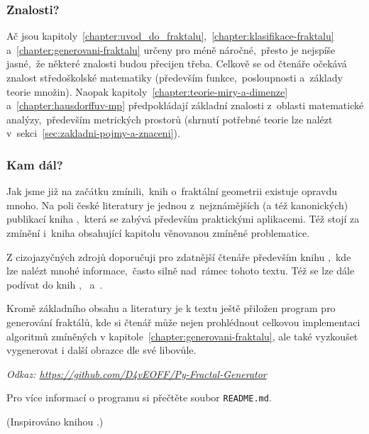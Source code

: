 \subsubsection{Znalosti?}

Ač jsou kapitoly~\ref{chapter:uvod_do_fraktalu},~\ref{chapter:klasifikace-fraktalu} a~\ref{chapter:generovani-fraktalu} určeny pro méně náročné,~přesto je nejspíše jasné,~že některé znalosti budou přecijen třeba. Celkově se od čtenáře očekává znalost středoškolské matematiky (především funkce,~posloupnosti a~základy teorie množin). Naopak kapitoly~\ref{chapter:teorie-miry-a-dimenze} a~\ref{chapter:hausdorffuv-mp} předpokládají základní znalosti z~oblasti matematické analýzy,~především metrických prostorů (shrnutí potřebné teorie lze nalézt v~sekci~\ref{sec:zakladni-pojmy-a-znaceni}).

\subsubsection{Kam dál?}

Jak jsme již na začátku zmínili,~knih o~fraktální geometrii existuje opravdu mnoho. Na poli české literatury je jednou z~nejznámějších (a též kanonických) publikací kniha \cite{Zelinka2006},~která se zabývá především praktickými aplikacemi. Též stojí za zmínění i~kniha \cite{Voracova2022} obsahující kapitolu věnovanou zmíněné problematice.

Z cizojazyčných zdrojů doporučuji pro zdatnější čtenáře především knihu \cite{Falconer1989},~kde lze nalézt mnohé informace,~často silně nad~rámec tohoto textu. Též se lze dále podívat do knih \cite{Prusinkiewicz1990},~\cite{Edgar2008} a~\cite{Mattila1995}.

Kromě základního obsahu a literatury je k textu ještě přiložen program pro generování fraktálů, kde si čtenář může nejen prohlédnout celkovou implementaci algoritmů zmíněných v kapitole~\ref{chapter:generovani-fraktalu}, ale také vyzkoušet vygenerovat i další obrazce dle své libovůle.

\textit{Odkaz: \url{https://github.com/D4vEOFF/Py-Fractal-Generator}}

Pro více informací o programu si přečtěte soubor \texttt{README.md}.

(Inspirováno knihou \cite{Hladik2019}.)